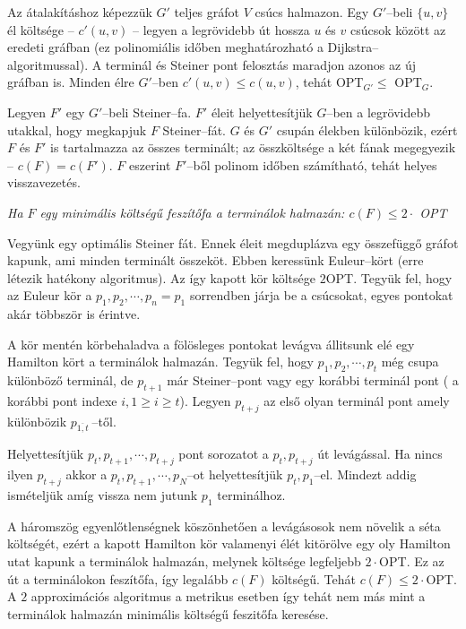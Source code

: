Az átalakításhoz képezzük $G'$ teljes gráfot $V$ csúcs halmazon. Egy $G'$--beli
$\{u,v\}$ él költsége -- $c'(u,v)$ -- legyen a legrövidebb út hossza $u$ és $v$
csúcsok között az eredeti gráfban (ez polinomiális időben meghatározható a
Dijkstra--algoritmussal). A terminál és Steiner pont felosztás maradjon azonos
az új gráfban is. Minden élre $G'$--ben $c'(u,v) \leq c(u,v)$, tehát OPT$_{G'}
	\leq$ OPT$_{G}$.

Legyen $F'$ egy $G'$--beli Steiner--fa. $F'$ éleit helyettesítjük $G$--ben a
legrövidebb utakkal, hogy megkapjuk $F$ Steiner--fát. $G$ és $G'$ csupán élekben
különbözik, ezért $F$ és $F'$ is tartalmazza az összes terminált; az
összköltsége a két fának megegyezik -- $c(F)=c(F')$. $F$ eszerint $F'$--ből
polinom időben számítható, tehát helyes visszavezetés.

\vspace{0.4cm}
\emph{Ha $F$ egy minimális költségű feszítőfa a terminálok halmazán:
	$c(F) \leq  2 \cdot $ OPT}
\vspace{0.4cm}

Vegyünk egy optimális Steiner fát. Ennek éleit megduplázva egy összefüggő
gráfot kapunk, ami minden terminált összeköt. Ebben keressünk Euleur--kört
(erre létezik hatékony algoritmus). Az így  kapott kör költsége $2$OPT.
Tegyük fel, hogy az Euleur kör a $p_1, p_2, \cdots, p_n=p_1$ sorrendben járja
be a csúcsokat, egyes pontokat akár többször is érintve.

A kör mentén körbehaladva a fölösleges pontokat levágva állitsunk elé egy
Hamilton kört a terminálok halmazán. Tegyük fel, hogy $p_1, p_2, \cdots, p_t$
még csupa különböző terminál, de $p_{t+1}$ már Steiner--pont vagy egy korábbi
terminál pont ( a korábbi pont indexe $i, 1 \geq i \geq t$). Legyen $p_{t+j}$ az
első olyan terminál pont amely különbözik $p_{\overline{1,t}}~$--től.

Helyettesítjük $p_t, p_{t+1}, \cdots, p_{t+j}$ pont sorozatot a $p_t, p_{t+j}$
út levágással. Ha nincs ilyen $p_{t+j}$ akkor a $p_t, p_{t+1}, \cdots, p_N$--ot
helyettesítjük $p_t,p_1$--el. Mindezt addig ismételjük amíg vissza nem jutunk
$p_1$ terminálhoz.

A háromszög egyenlőtlenségnek köszönhetően a levágásosok nem növelik a séta
költségét, ezért a kapott Hamilton kör valamenyi élét kitörölve egy oly
Hamilton utat kapunk a terminálok halmazán, melynek költsége legfeljebb
$2\cdot$OPT. Ez az út a terminálokon feszítőfa, így legalább $c(F)$ költségű.
Tehát $c(F) \leq 2 \cdot$OPT. A $2$ approximációs algoritmus a metrikus esetben
így tehát nem más mint a terminálok halmazán minimális költségű feszitőfa
keresése.

